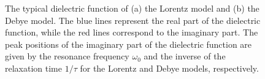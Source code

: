 \begin{figure}[htb] %
\centering
\begin{subcaptionblock}{0.45\linewidth}
\subcaption{}\label{Fig:lorentz}
\end{subcaptionblock}\hfill
 \begin{subcaptionblock}{0.45\linewidth}
\subcaption{}\label{Fig:debye}
\end{subcaptionblock}
  \caption{The typical dielectric function of (a) the Lorentz model and (b) the Debye model. The blue lines represent the real part of the dielectric function, while the red lines correspond to the imaginary part. The peak positions of the imaginary part of the dielectric function are given by the resonance frequency $\omega_{0}$ and the inverse of the relaxation time $1/\tau$ for the Lorentz and Debye models, respectively.}
\label{Fig:models}  
\end{figure}

